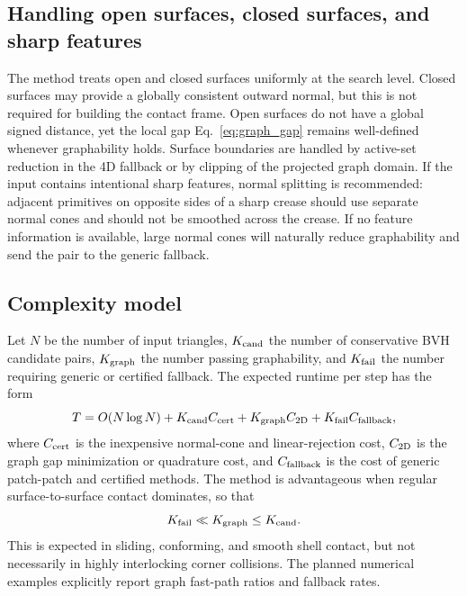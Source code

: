 \documentclass[preprint,12pt]{elsarticle}
\begin{document}
\subsection{Handling open surfaces, closed surfaces, and sharp features}

The method treats open and closed surfaces uniformly at the search level. Closed surfaces may provide a globally consistent outward normal, but this is not required for building the contact frame. Open surfaces do not have a global signed distance, yet the local gap Eq.~\eqref{eq:graph_gap} remains well-defined whenever graphability holds. Surface boundaries are handled by active-set reduction in the 4D fallback or by clipping of the projected graph domain. If the input contains intentional sharp features, normal splitting is recommended: adjacent primitives on opposite sides of a sharp crease should use separate normal cones and should not be smoothed across the crease. If no feature information is available, large normal cones will naturally reduce graphability and send the pair to the generic fallback.

\subsection{Complexity model}

Let $N$ be the number of input triangles, $K_{\rm cand}$ the number of conservative BVH candidate pairs, $K_{\rm graph}$ the number passing graphability, and $K_{\rm fail}$ the number requiring generic or certified fallback. The expected runtime per step has the form
\begin{equation}
    T = O(N\log N) + K_{\rm cand} C_{\rm cert}
        + K_{\rm graph} C_{\rm 2D}
        + K_{\rm fail} C_{\rm fallback},
    \label{eq:complexity}
\end{equation}
where $C_{\rm cert}$ is the inexpensive normal-cone and linear-rejection cost, $C_{\rm 2D}$ is the graph gap minimization or quadrature cost, and $C_{\rm fallback}$ is the cost of generic patch-patch and certified methods. The method is advantageous when regular surface-to-surface contact dominates, so that
\begin{equation}
    K_{\rm fail}\ll K_{\rm graph}\le K_{\rm cand}.
\end{equation}
This is expected in sliding, conforming, and smooth shell contact, but not necessarily in highly interlocking corner collisions. The planned numerical examples explicitly report graph fast-path ratios and fallback rates.
\end{document}
